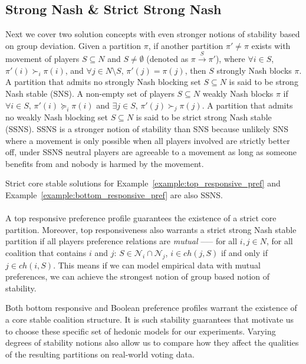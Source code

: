 \subsection{Strong Nash \& Strict Strong Nash}
\label{subsec:strong_nash_strict_strong_nash}
Next we cover two solution concepts with even stronger notions of stability
based on group deviation.
Given a partition $\pi$, if another partition $\pi' \neq \pi$ exists with
movement of players $S \subseteq N$ and $S \neq \emptyset$ (denoted as
$\pi \xrightarrow{S} \pi'$), where $\forall i \in S$, $\pi'(i) \succ_i \pi(i)$,
and $\forall j \in N\text{\textbackslash}S$, $\pi'(j) = \pi(j)$,
then $S$ strongly Nash blocks $\pi$.
A partition that admits no strongly Nash blocking set $S \subseteq N$ is said
to be strong Nash stable (SNS).
A non-empty set of players $S \subseteq N$ weakly Nash blocks $\pi$ if
$\forall i \in S$, $\pi'(i) \succeq_i \pi(i)$ and $\exists j \in S$,
$\pi'(j) \succ_j \pi(j)$.
A partition that admits no weakly Nash blocking set $S \subseteq N$ is said to
be strict strong Nash stable (SSNS).
SSNS is a stronger notion of stability than SNS because unlikely SNS where a
movement is only possible when all players involved are strictly better off, 
under SSNS neutral players are agreeable to a movement as long as someone benefits
from and nobody is harmed by the movement.

Strict core stable solutions for Example~\ref{example:top_responsive_pref}
and Example~\ref{example:bottom_responsive_pref} are also SSNS.

\paragraph{}
A top responsive preference profile guarantees the existence of a strict core partition.
Moreover, top responsiveness also warrants a strict strong Nash stable partition
if all players preference relations are \textit{mutual} ––– for all $i, j \in N$,
for all coalition that contains $i$ and $j$:
$S \in \mathcal{N}_i \cap \mathcal{N}_j$, $i \in ch(j, S)$ if and only if
$j \in ch(i, S)$.
This means if we can model empirical data with mutual preferences,
we can achieve the strongest notion of group based notion of stability.

Both bottom responsive and Boolean preference profiles warrant the existence of
a core stable coalition structure.
It is such stability guarantees that motivate us to choose these specific set
of hedonic models for our experiments.
Varying degrees of stability notions also allow us to compare how they affect
the qualities of the resulting partitions on real-world voting data.


